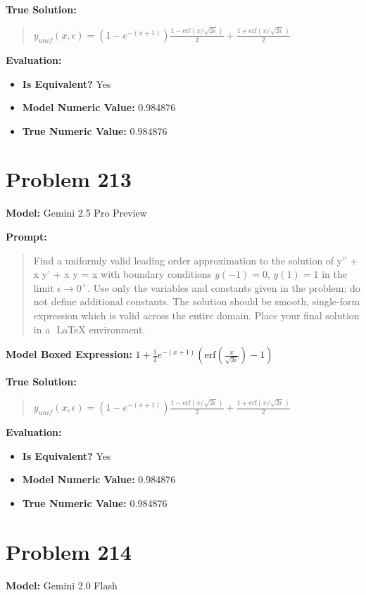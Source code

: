 \documentclass{article}
\begin{document}
{\textbf{True Solution:}
\begin{quote}
$y_{unif}(x, \epsilon) = \left(1 - e^{-(x+1)}\right) \frac{1-\text{erf}(x/\sqrt{2\epsilon})}{2} + \frac{1+\text{erf}(x/\sqrt{2\epsilon})}{2}$
\end{quote}

\textbf{Evaluation:}
\begin{itemize}
\item \textbf{Is Equivalent?} Yes
\item \textbf{Model Numeric Value:} 0.984876
\item \textbf{True Numeric Value:} 0.984876
\end{itemize}
\vspace{1cm}
\section*{Problem 213}
\textbf{Model:} Gemini 2.5 Pro Preview

\textbf{Prompt:}
\begin{quote}
Find a uniformly valid leading order approximation to the solution of \epsilon y'' + x y' + x y = x with boundary conditions $y(-1) = 0$, $y(1) = 1$ in the limit $\epsilon \to 0^+$. Use only the variables and constants given in the problem; do not define additional constants. The solution should be smooth, single-form expression which is valid across the entire domain. Place your final solution in a $\boxed{}$ LaTeX environment.
\end{quote}
\textbf{Model Boxed Expression:} $1 + \frac{1}{2}e^{-(x+1)}\left(\text{erf}\left(\frac{x}{\sqrt{2\epsilon}}\right)-1\right)$

\textbf{True Solution:}
\begin{quote}
$y_{unif}(x, \epsilon) = \left(1 - e^{-(x+1)}\right) \frac{1-\text{erf}(x/\sqrt{2\epsilon})}{2} + \frac{1+\text{erf}(x/\sqrt{2\epsilon})}{2}$
\end{quote}

\textbf{Evaluation:}
\begin{itemize}
\item \textbf{Is Equivalent?} Yes
\item \textbf{Model Numeric Value:} 0.984876
\item \textbf{True Numeric Value:} 0.984876
\end{itemize}
\vspace{1cm}
\section*{Problem 214}
\textbf{Model:} Gemini 2.0 Flash

}
\end{document}
